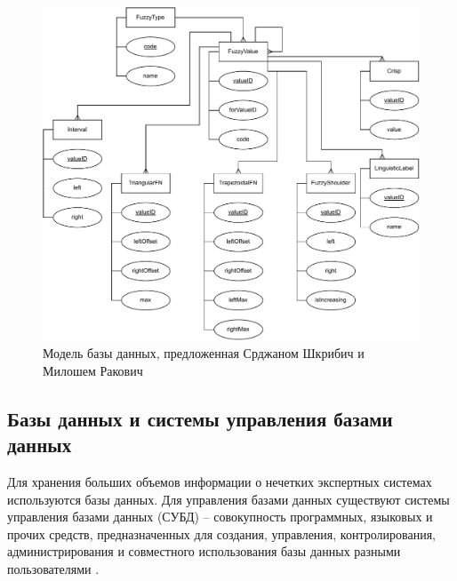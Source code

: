 \begin{figure}[H]
	\centering
	\includegraphics[width=0.85\linewidth]{img/Existing2}
	\caption{Модель базы данных, предложенная Срджаном Шкрибич и Милошем Ракович}
	\label{fig:existing2}
\end{figure}

\subsection{Базы данных и системы управления базами данных}
Для хранения больших объемов информации о нечетких экспертных системах используются базы данных. Для управления базами данных существуют системы управления базами данных (СУБД) -- совокупность программных, языковых и прочих средств, предназначенных для создания, управления, контролирования, администрирования и совместного использования базы данных разными пользователями \cite{OverviewComparativeDMS}.

